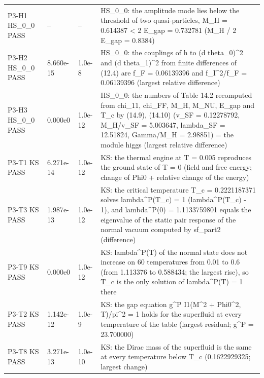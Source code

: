 \documentclass[aps,prd,onecolumn,superscriptaddress,nofootinbib,floatfix,longbibliography]{revtex4-2}
\begin{document}
\begin{longtable}{p{}p{}p{}p{}}
P3-H1 HS\_0\_0 \newline PASS & -- & -- & HS\_0\_0: the amplitude mode lies below the threshold of two quasi-particles, M\_H = 0.614387 \textless{} 2 E\_gap = 0.732781 (M\_H / 2 E\_gap = 0.8384) \\
P3-H2 HS\_0\_0 \newline PASS & 8.660e-15 & 1.0e-8 & HS\_0\_0: the couplings of h to (d theta\_0)\textasciicircum{}2 and (d theta\_1)\textasciicircum{}2 from finite differences of (12.4) are f\_F = 0.06139396 and f\_I\textasciicircum{}2/f\_F = 0.06139396 (largest relative difference) \\
P3-H3 HS\_0\_0 \newline PASS & 0.000e0 & 1.0e-12 & HS\_0\_0: the numbers of Table 14.2 recomputed from chi\_11, chi\_FF, M\_H, M\_NU, E\_gap and T\_c by (14.9), (14.10) (v\_SF = 0.12278792, M\_H/v\_SF = 5.003647, lambda\_SF = 12.51824, Gamma/M\_H = 2.98851) = the module higgs (largest relative difference) \\
P3-T1 KS \newline PASS & 6.271e-14 & 1.0e-12 & KS: the thermal engine at T = 0.005 reproduces the ground state of T = 0 (field and free energy; \textbar{}change of Phi0\textbar{} + relative change of the energy) \\
P3-T3 KS \newline PASS & 1.987e-13 & 1.0e-12 & KS: the critical temperature T\_c = 0.2221187371 solves lambda\textasciicircum{}P(T\_c) = 1 (\textbar{}lambda\textasciicircum{}P(T\_c) - 1\textbar{}), and lambda\textasciicircum{}P(0) = 1.1133759801 equals the eigenvalue of the static pair response of the normal vacuum computed by sf\_part2 (difference) \\
P3-T9 KS \newline PASS & 0.000e0 & 1.0e-12 & KS: lambda\textasciicircum{}P(T) of the normal state does not increase on 60 temperatures from 0.01 to 0.6 (from 1.113376 to 0.588434; the largest rise), so T\_c is the only solution of lambda\textasciicircum{}P(T) = 1 there \\
P3-T2 KS \newline PASS & 1.142e-12 & 1.0e-9 & KS: the gap equation g\textasciicircum{}P I1(M\textasciicircum{}2 + Phi0\textasciicircum{}2, T)/pi\textasciicircum{}2 = 1 holds for the superfluid at every temperature of the table (largest \textbar{}residual\textbar{}; g\textasciicircum{}P = 23.700000) \\
P3-T8 KS \newline PASS & 3.271e-13 & 1.0e-10 & KS: the Dirac mass of the superfluid is the same at every temperature below T\_c (0.1622929325; largest change) \\

\end{longtable}
\end{document}

